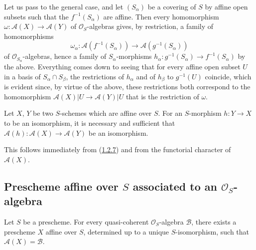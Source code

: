 Let us pass to the general case, and let $(S_\alpha)$ be a covering of $S$
by affine open subsets
such that the $f^{-1}(S_\alpha)$ are affine. Then every homomorphism
$\omega:\mathcal{A}(X)\to\mathcal{A}(Y)$ of $\mathcal{O}_S$-algebras gives,
by restriction, a family of homomorphisms
\[
  \omega_\alpha:
  \mathcal{A}(f^{-1}(S_\alpha))\to
  \mathcal{A}(g^{-1}(S_\alpha))
\]
of $\mathcal{O}_{S_\alpha}$-algebras, hence a family of
$S_\alpha$-morphisms
$h_\alpha:g^{-1}(S_\alpha)\to f^{-1}(S_\alpha)$ by the above.
Everything comes down to seeing that for every affine open subset $U$ in a
basis of $S_\alpha\cap S_\beta$, the restrictions of $h_\alpha$ and of
$h_\beta$ to $g^{-1}(U)$ coincide, which is evident since, by virtue of the
above, these restrictions both correspond to the homomorphism
$\mathcal{A}(X)|U\to\mathcal{A}(Y)|U$ that is the restriction of $\omega$.

\begin{corollary}[1.2.8]
\label{II.1.2.8}
Let $X$, $Y$ be two $S$-schemes which are affine over $S$. For an
$S$-morphism $h:Y\to X$ to be an isomorphism, it is necessary and sufficient
that $\mathcal{A}(h):\mathcal{A}(X)\to\mathcal{A}(Y)$ be an isomorphism.
\end{corollary}

This follows immediately from (\hyperref[II.1.2.7]{1.2.7}) and from the
functorial character of $\mathcal{A}(X)$.

\subsection{Prescheme affine over $S$ associated to an
$\mathcal{O}_S$-algebra}
\label{subsection:II.1.3}

\begin{proposition}[1.3.1]
\label{II.1.3.1}
Let $S$ be a prescheme. For every quasi-coherent $\mathcal{O}_S$-algebra
$\mathcal{B}$, there exists a prescheme $X$ affine over $S$, determined up
to a unique $S$-isomorphism, such that $\mathcal{A}(X)=\mathcal{B}$.
\end{proposition}


